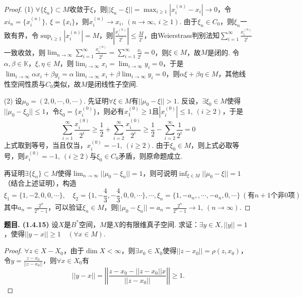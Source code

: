 \documentclass[12pt, a4paper, oneside]{ctexart}
\newcounter{problem}  %
\newenvironment{problem}[1][]{\stepcounter{problem}\par\noindent\textbf{题目\arabic{problem}. #1}}{\smallskip\par}
\let\leq=\leqslant %
\let\geq=\geqslant %
\def\K{\mathbb{K}}          %
\def\add{\vspace{1ex}}      %
\begin{document}
\begin{proof}
    (1) $\forall \{\xi_n\}\subset M$收敛于$\xi$，则$||\xi_n-\xi|| = \max_{i\geq 1}|x_i^{(n)}-x_i|\to 0$，令$xi_n = \{x_i^{(n)}\},\ \xi = \{x_i\}$，则$x_i^{(n)}\to x_i,\ (n\to \infty,\ i\geq 1)$. 由于$\xi_n\in C_0$，则$\xi_n$一致有界，令$\sup_{i\geq 1}|x_i^{(n)}| = M$，则$\left|\frac{x_i^{(n)}}{2^i}\right|\leq \frac{M}{2^i}$，由Weierstrass判别法知$\sum_{i=1}^\infty \frac{x_i^{(n)}}{2^i}$一致收敛，则$\lim_{n\to\infty}\sum_{i=1}^\infty \frac{x_i^{(n)}}{2^i} = \sum_{i=1}^\infty \frac{x_i}{2^i} = 0$，\add 则$\xi \in M$，故$M$是闭的. 令$\alpha,\beta\in \K$，$\xi,\eta\in M$，则$\lim_{i\to\infty}x_i= \lim_{i\to\infty}y_i = 0$，于是$\lim_{i\to\infty}\alpha x_i+\beta y_i = \alpha\lim_{i\to\infty}x_i+\beta\lim_{i\to\infty}y_i = 0$，则$\alpha \xi+\beta\eta\in M$，其他线性空间性质与$C_0$类似，故$M$是闭线性子空间.

    (2) 设$\mu_0 = (2,0,\cdots, 0,\cdots)$. 先证明$\forall \xi \in M$有$||\mu_0-\xi|| >1$. 反设，$\exists \xi_0\in M$使得$||\mu_0-\xi_0||\leq 1$，令$\xi_0=\{x_i^{(0)}\}$，则必有$x_1^{(0)}\geq 1$且$|x_i^{(0)}|\leq 1,\ (i\geq 2)$，于是
    \begin{equation*}
        \sum_{i=1}^\infty \frac{x_i^{(0)}}{2^i}\geq \frac{1}{2}+\sum_{i=2}^\infty \frac{x_i^{(0)}}{2^i}\geq \frac{1}{2}-\sum_{i=2}^\infty\frac{1}{2^i} = 0
    \end{equation*}
    上式取到等号，当且仅当，$x_i^{(0)} = -1,\ (i\geq 2)$. 由于$\xi_0\in M$，则上式必取等号，则$x_i^{(0)}= -1,\ (i\geq 2)$与$\xi_0\in C_0$矛盾，则原命题成立.

    再证明$\exists \{\xi_n\}\subset M$使得$\lim_{n\to\infty}||\mu_0-\xi_n||=1$，则可说明$\inf_{\xi\in M}||\mu_0-\xi||=1$（结合上述证明），构造
    \begin{equation*}
        \xi_1 = \{1,-2,0,0,\cdots\},\quad \xi_2=\{1,-\frac{4}{3},-\frac{4}{3},0,0,\cdots\},\cdots,\xi_n=\{1,-a_n,,\cdots,-a_n,0,\cdots\}\ (\text{有}n+1\text{个非}0\text{项})
    \end{equation*}
    其中$a_n=\frac{2^n}{2^n-1}$，可以验证$\xi_n\in M$，则$||\mu_0-\xi_n|| = a_n=\frac{2^n}{2^n-1}\to 1,\ (n\to\infty)$.
\end{proof}
\begin{problem}[(1.4.15)]
    设$X$是$B^*$空间，$M$是$X$的有限维真子空间. 求证：$\exists y\in X,||y||=1$，使得$||y-x||\geq 1\quad (\forall x\in M)$.
\end{problem}
\begin{proof}
    $\forall z\in X-X_0$，由于$\dim X < \infty$，则$\exists x_0\in X_0$使得$||z-x_0||=\rho(z,x_0)$，令$y = \frac{z-x_0}{||z-x_0||}$，则$\forall x\in X_0$有
    \begin{equation*}
        ||y-x|| = \left|\left|\frac{z-x_0-||z-x_0||x}{||z-x_0||}\right|\right|\geq 1.
    \end{equation*}
\end{proof}
\end{document}
